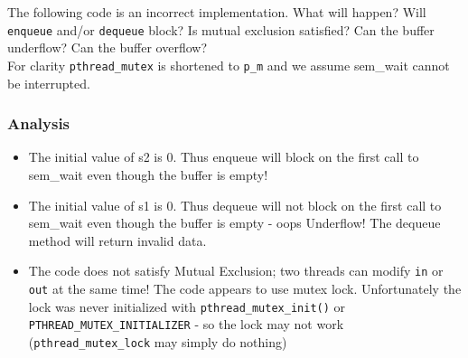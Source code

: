 The following code is an incorrect implementation. What will happen?
Will \texttt{enqueue} and/or \texttt{dequeue} block? Is mutual exclusion
satisfied? Can the buffer underflow? Can the buffer overflow?\\For
clarity \texttt{pthread\_mutex} is shortened to \texttt{p\_m} and we
assume sem\_wait cannot be interrupted.

\begin{Shaded}
\begin{Highlighting}[]
 \NormalTok{*b[}\NormalTok{]}
 
 
    \NormalTok{,}\NormalTok{)}
    \NormalTok{,}\NormalTok{)}
\NormalTok{\}}

 


 \NormalTok{b[ (in++) & (N}\NormalTok{) ] = value}

\NormalTok{\}}

 
   \NormalTok{*result = b[(out++) & }\NormalTok{]}

   
\NormalTok{\}}
\end{Highlighting}
\end{Shaded}

\subsubsection{Analysis}\label{analysis-1}

\begin{itemize}
\itemsep1pt\parskip0pt
\item
  The initial value of s2 is 0. Thus enqueue will block on the first
  call to sem\_wait even though the buffer is empty!
\item
  The initial value of s1 is 0. Thus dequeue will not block on the first
  call to sem\_wait even though the buffer is empty - oops Underflow!
  The dequeue method will return invalid data.
\item
  The code does not satisfy Mutual Exclusion; two threads can modify
  \texttt{in} or \texttt{out} at the same time! The code appears to use
  mutex lock. Unfortunately the lock was never initialized with
  \texttt{pthread\_mutex\_init()} or
  \texttt{PTHREAD\_MUTEX\_INITIALIZER} - so the lock may not work
  (\texttt{pthread\_mutex\_lock} may simply do nothing)
\end{itemize}

